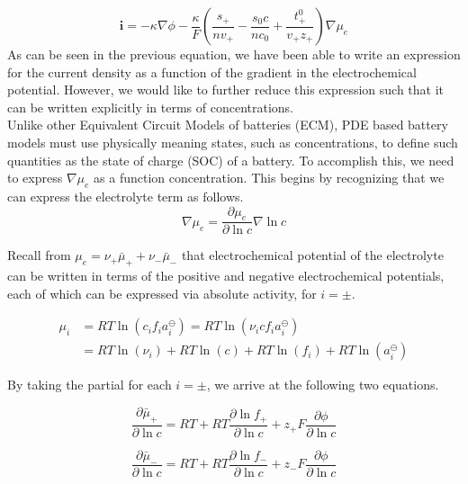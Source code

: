 \documentclass[lettersize,journal]{IEEEtran}
\begin{document}
\begin{equation}\label{current_density_mu_e}
  \mathbf{i} =-\kappa \nabla \phi-\frac{\kappa}{F}\left(\frac{s_{+}}{n v_{+}}-\frac{s_{0} c}{n c_{0}}+\frac{t_{+}^{0}}{v_{+} z_{+}}\right) \nabla \mu_{e}
\end{equation}
\noindent As can be seen in the previous equation, we have been able to write an expression for the current density as a function of the gradient in the electrochemical potential. However, we would like to further reduce this expression such that it can be written explicitly in terms of concentrations. \\

Unlike other Equivalent Circuit Models of batteries (ECM), PDE based battery models must use physically meaning states, such as concentrations, to define such quantities as the state of charge (SOC) of a battery. To accomplish this, we need to express $\nabla \mu_e$ as a function concentration. This begins by recognizing that we can express the electrolyte term as follows.
\begin{equation}
\nabla \mu_{e}=\frac{\partial \mu_{e}}{\partial \ln c} \nabla \ln c
\end{equation}

\noindent Recall from $ \mu_{e}=\nu_{+} \bar{\mu}_{+}+\nu_{-} \bar{\mu}_{-}$ that electrochemical potential of the electrolyte can be written in terms of the positive and negative electrochemical potentials, each of which can be expressed via absolute activity, for $i = \pm$.

\begin{equation}
\begin{aligned}
\mu_{i} &=R T \ln \left(c_{i} f_{i} a_{i}^{\ominus}\right)=R T \ln \left(\nu_{i} c f_{i} a_{i}^{\ominus}\right) \\
&=R T \ln \left(\nu_{i}\right)+R T \ln (c)+R T \ln \left(f_{i}\right)+R T \ln \left(a_{i}^{\ominus}\right)
\end{aligned}
\end{equation}

\noindent By taking the partial for each $i = \pm$, we arrive at the following two equations.

\begin{equation}
\frac{\partial \bar{\mu}_{+}}{\partial \ln c}=R T+R T \frac{\partial \ln f_{+}}{\partial \ln c}+z_{+} F \frac{\partial \phi}{\partial \ln c}
\end{equation}

\begin{equation}
\frac{\partial \bar{\mu}_{-}}{\partial \ln c}=R T+R T \frac{\partial \ln f_{-}}{\partial \ln c}+z_{-} F \frac{\partial \phi}{\partial \ln c}
\end{equation}
\end{document}
